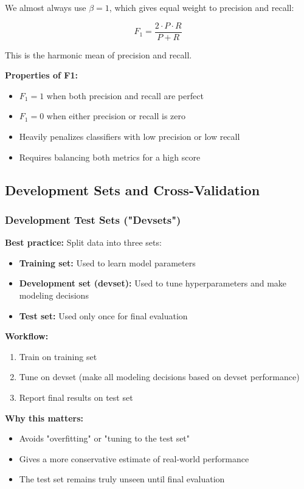 \documentclass[11pt,a4paper]{article}
\theoremstyle{definition}
\theoremstyle{plain}
\theoremstyle{remark}
\begin{document}
We almost always use $\beta = 1$, which gives equal weight to precision and recall:

\[
F_1 = \frac{2 \cdot P \cdot R}{P + R}
\]

This is the harmonic mean of precision and recall.

\textbf{Properties of F1:}
\begin{itemize}
    \item $F_1 = 1$ when both precision and recall are perfect
    \item $F_1 = 0$ when either precision or recall is zero
    \item Heavily penalizes classifiers with low precision or low recall
    \item Requires balancing both metrics for a high score
\end{itemize}

\subsection{Development Sets and Cross-Validation}

\subsubsection{Development Test Sets ("Devsets")}

\textbf{Best practice:} Split data into three sets:
\begin{itemize}
    \item \textbf{Training set:} Used to learn model parameters
    \item \textbf{Development set (devset):} Used to tune hyperparameters and make modeling decisions
    \item \textbf{Test set:} Used only once for final evaluation
\end{itemize}

\textbf{Workflow:}
\begin{enumerate}
    \item Train on training set
    \item Tune on devset (make all modeling decisions based on devset performance)
    \item Report final results on test set
\end{enumerate}

\textbf{Why this matters:}
\begin{itemize}
    \item Avoids "overfitting" or "tuning to the test set"
    \item Gives a more conservative estimate of real-world performance
    \item The test set remains truly unseen until final evaluation
\end{itemize}
\end{document}
